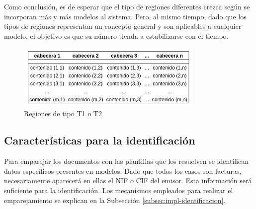 Como conclusión, es de esperar que el tipo de regiones diferentes crezca según se incorporan más y más modelos al sistema. Pero, al mismo tiempo, dado que los tipos de regiones representan un concepto general y son aplicables a cualquier modelo, el objetivo es que su número tienda a estabilizarse con el tiempo.

\begin{figure}[hp!]
	\centering
	\includegraphics[width=0.8\textwidth]{imaxes/g-analisis/region-t1-t2}
	\caption{Regiones de tipo T1 o T2}
	\label{fig:regiones-t1-t2}
\end{figure}


\newpage

\subsection{Características para la identificación}

Para emparejar los documentos con las plantillas que los resuelven se identifican datos específicos presentes en modelos. Dado que todos los casos son facturas, necesariamente aparecerá en ellas el NIF o CIF del emisor. Esta información será suficiente para la identificación. Los mecanismos empleados para realizar el emparejamiento se explican en la Subsección \ref{subsec:impl-identificacion}.

